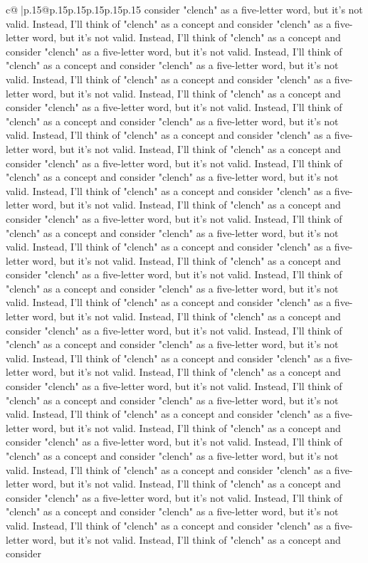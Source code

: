 \documentclass{article}
\begin{document}
{\begin{supertabular}{c@{$\;$}|p{.15\linewidth}@{}p{.15\linewidth}p{.15\linewidth}p{.15\linewidth}p{.15\linewidth}p{.15\linewidth}}
{{{consider "clench" as a five-letter word, but it's not valid. Instead, I'll think of "clench" as a concept and consider "clench" as a five-letter word, but it's not valid. Instead, I'll think of "clench" as a concept and consider "clench" as a five-letter word, but it's not valid. Instead, I'll think of "clench" as a concept and consider "clench" as a five-letter word, but it's not valid. Instead, I'll think of "clench" as a concept and consider "clench" as a five-letter word, but it's not valid. Instead, I'll think of "clench" as a concept and consider "clench" as a five-letter word, but it's not valid. Instead, I'll think of "clench" as a concept and consider "clench" as a five-letter word, but it's not valid. Instead, I'll think of "clench" as a concept and consider "clench" as a five-letter word, but it's not valid. Instead, I'll think of "clench" as a concept and consider "clench" as a five-letter word, but it's not valid. Instead, I'll think of "clench" as a concept and consider "clench" as a five-letter word, but it's not valid. Instead, I'll think of "clench" as a concept and consider "clench" as a five-letter word, but it's not valid. Instead, I'll think of "clench" as a concept and consider "clench" as a five-letter word, but it's not valid. Instead, I'll think of "clench" as a concept and consider "clench" as a five-letter word, but it's not valid. Instead, I'll think of "clench" as a concept and consider "clench" as a five-letter word, but it's not valid. Instead, I'll think of "clench" as a concept and consider "clench" as a five-letter word, but it's not valid. Instead, I'll think of "clench" as a concept and consider "clench" as a five-letter word, but it's not valid. Instead, I'll think of "clench" as a concept and consider "clench" as a five-letter word, but it's not valid. Instead, I'll think of "clench" as a concept and consider "clench" as a five-letter word, but it's not valid. Instead, I'll think of "clench" as a concept and consider "clench" as a five-letter word, but it's not valid. Instead, I'll think of "clench" as a concept and consider "clench" as a five-letter word, but it's not valid. Instead, I'll think of "clench" as a concept and consider "clench" as a five-letter word, but it's not valid. Instead, I'll think of "clench" as a concept and consider "clench" as a five-letter word, but it's not valid. Instead, I'll think of "clench" as a concept and consider "clench" as a five-letter word, but it's not valid. Instead, I'll think of "clench" as a concept and consider "clench" as a five-letter word, but it's not valid. Instead, I'll think of "clench" as a concept and consider "clench" as a five-letter word, but it's not valid. Instead, I'll think of "clench" as a concept and consider "clench" as a five-letter word, but it's not valid. Instead, I'll think of "clench" as a concept and consider "clench" as a five-letter word, but it's not valid. Instead, I'll think of "clench" as a concept and consider "clench" as a five-letter word, but it's not valid. Instead, I'll think of "clench" as a concept and consider "clench" as a five-letter word, but it's not valid. Instead, I'll think of "clench" as a concept and consider }}}
\end{supertabular}}
\end{document}
